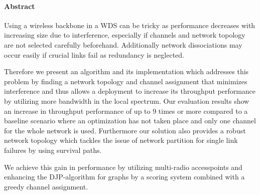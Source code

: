 \cleardoublepage

\vspace {2cm}
\begin{center}
\paragraph{Abstract}
\hrulefill
\end{center}
Using a wireless backbone in a \ac{WDS} can be tricky as performance decreases with increasing size due to interference, 
especially if channels and network topology are not selected carefully beforehand. 
Additionally network dissociations may occur easily if crucial links fail as redundancy is neglected.

Therefore we present an algorithm and its implementation which addresses this problem by finding a network topology and channel assignment 
that minimizes interference and thus allows a deployment to increase its throughput performance by utilizing more bandwidth in the local spectrum. 
Our evaluation results show an increase in throughput performance of up to 9 times or more compared to a baseline scenario where an optimization has not taken place
and only one channel for the whole network is used.
Furthermore our solution also provides a robust network topology which tackles the issue of network partition for single link failures by using survival paths.

We achieve this gain in performance by utilizing multi-radio accesspoints and enhancing the \ac{DJP}-algorithm for graphs by a scoring system combined with
a greedy channel assignment.

